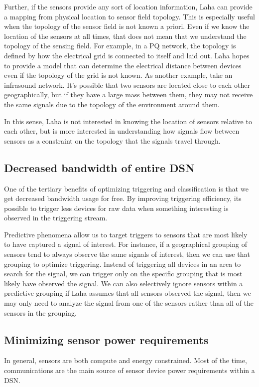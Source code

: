Further, if the sensors provide any sort of location information, Laha can provide a mapping from physical location to sensor field topology. This is especially useful when the topology of the sensor field is not known a priori. Even if we know the location of the sensors at all times, that does not mean that we understand the topology of the sensing field. For example, in a PQ network, the topology is defined by how the electrical grid is connected to itself and laid out. Laha hopes to provide a model that can determine the electrical distance between devices even if the topology of the grid is not known. As another example, take an infrasound network. It's possible that two sensors are located close to each other geographically, but if they have a large mass between them, they may not receive the same signals due to the topology of the environment around them. 

In this sense, Laha is not interested in knowing the location of sensors relative to each other, but is more interested in understanding how signals flow between sensors as a constraint on the topology that the signals travel through.


\subsection{Decreased bandwidth of entire DSN}
One of the tertiary benefits of optimizing triggering and classification is that we get decreased bandwidth usage for free. By improving triggering efficiency, its possible to trigger less devices for raw data when something interesting is observed in the triggering stream.

Predictive phenomena allow us to target triggers to sensors that are most likely to have captured a signal of interest. For instance, if a geographical grouping of sensors tend to always observe the same signals of interest, then we can use that grouping to optimize triggering. Instead of triggering all devices in an area to search for the signal, we can trigger only on the specific grouping that is most likely have observed the signal. We can also selectively ignore sensors within a predictive grouping if Laha assumes that all sensors observed the signal, then we may only need to analyze the signal from one of the sensors rather than all of the sensors in the grouping.

\subsection{Minimizing sensor power requirements}
In general, sensors are both compute and energy constrained. Most of the time, communications are the main source of sensor device power requirements within a DSN.

